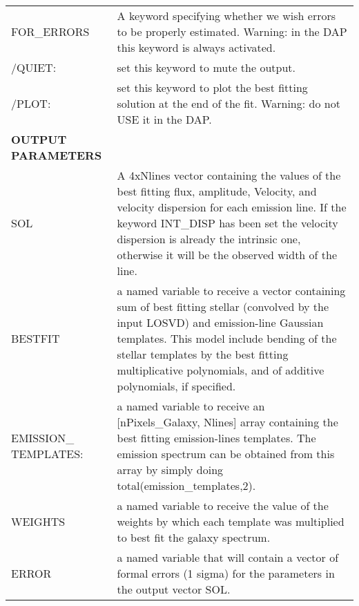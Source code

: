\begin{center}
\begin{longtable}{p{2.7cm}| p{11.1cm}}
%
FOR\_ERRORS & A keyword specifying whether we wish errors to be
       properly estimated. Warning: in the DAP this keyword is always activated.\\
%
   /QUIET:& set this keyword to mute the output.\\
%
  /PLOT:& set this keyword to plot the best fitting solution at the end
  of the fit. Warning: do not USE it in the DAP.\\
%
\hline
{\bf OUTPUT PARAMETERS}  & \\
\hline
SOL & A 4xNlines vector containing the values of the best fitting
       flux, amplitude, Velocity, and velocity dispersion for each
       emission line. If the keyword INT\_DISP has been set the velocity
       dispersion is already the intrinsic one, otherwise it will be the
       observed width of the line.\\
%
BESTFIT & a named variable to receive a vector containing sum of
       best fitting stellar (convolved by the input LOSVD) and
       emission-line Gaussian templates. This model include bending
       of the stellar templates by the best fitting multiplicative
       polynomials, and of additive polynomials, if specified.\\
%   
EMISSION\_ TEMPLATES:& a named variable to receive an
       [nPixels\_Galaxy, Nlines] array containing the best fitting emission-lines
       templates. The emission spectrum can be obtained from this
       array by simply doing total(emission\_templates,2).\\
%
WEIGHTS& a named variable to receive the value of the weights by which
       each template was multiplied to best fit the galaxy spectrum.\\
%
ERROR& a named variable that will contain a vector of formal
       errors (1 sigma) for the parameters in the output vector
       SOL.


\end{longtable}
\end{center}
